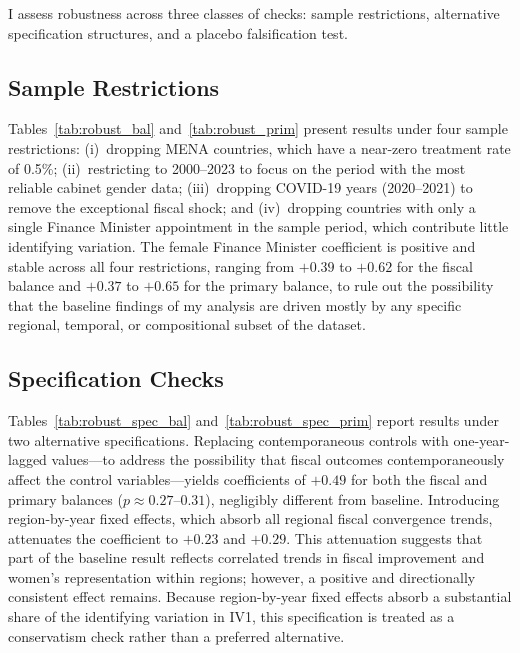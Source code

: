 \documentclass[12pt]{article}
\begin{document}
I assess robustness across three classes of checks: sample restrictions, 
alternative specification structures, and a placebo falsification test.

\subsection{Sample Restrictions}

Tables~\ref{tab:robust_bal} and~\ref{tab:robust_prim} present results under 
four sample restrictions: (i)~dropping MENA countries, which have a near-zero 
treatment rate of 0.5\%; (ii)~restricting to 2000--2023 to focus on the period 
with the most reliable cabinet gender data; (iii)~dropping COVID-19 years 
(2020--2021) to remove the exceptional fiscal shock; and (iv)~dropping 
countries with only a single Finance Minister appointment in the sample period, 
which contribute little identifying variation. The female Finance Minister 
coefficient is positive and stable across all four restrictions, ranging from 
$+0.39$ to $+0.62$ for the fiscal balance and $+0.37$ to $+0.65$ for the 
primary balance, to rule out the possibility that the baseline findings of my analysis are driven mostly 
by any specific regional, temporal, or compositional subset of the dataset.


\subsection{Specification Checks}

Tables~\ref{tab:robust_spec_bal} and~\ref{tab:robust_spec_prim} report results 
under two alternative specifications. Replacing contemporaneous controls with 
one-year-lagged values---to address the possibility that fiscal outcomes 
contemporaneously affect the control variables---yields coefficients of $+0.49$ 
for both the fiscal and primary balances ($p \approx 0.27$--$0.31$), 
negligibly different from baseline. Introducing region-by-year fixed effects, 
which absorb all regional fiscal convergence trends, attenuates the coefficient 
to $+0.23$ and $+0.29$. This attenuation suggests that part of the baseline 
result reflects correlated trends in fiscal improvement and women's 
representation within regions; however, a positive and directionally consistent 
effect remains. Because region-by-year fixed effects absorb a substantial share 
of the identifying variation in IV1, this specification is treated as a 
conservatism check rather than a preferred alternative.
\end{document}
